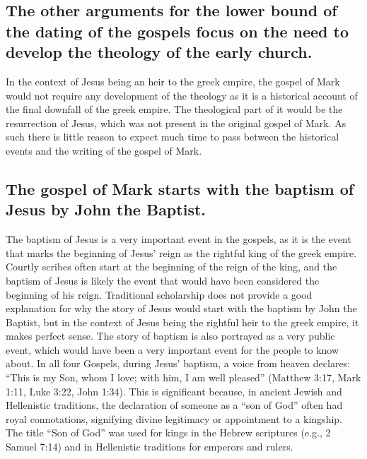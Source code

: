 \subsection{The other arguments for the lower bound of the dating of the gospels focus on the need to develop the theology of the early church.}\label{subsec:the-other-arguments-for-the-lower-bound-of-the-dating-of-the-gospels-focus-on-the-need-to-develop-the-theology-of-the-early-church.}

In the context of Jesus being an heir to the greek empire, the gospel of Mark would not require any development of the theology as it is a historical account of the final downfall of the greek empire.
The theological part of it would be the resurrection of Jesus, which was not present in the original gospel of Mark.
As such there is little reason to expect much time to pass between the historical events and the writing of the gospel of Mark.

\subsection{The gospel of Mark starts with the baptism of Jesus by John the Baptist.}\label{subsec:the-gospel-of-mark-starts-with-the-baptism-of-jesus-by-john-the-baptist.}

The baptism of Jesus is a very important event in the gospels, as it is the event that marks the beginning of Jesus' reign as the rightful king of the greek empire.
Courtly scribes often start at the beginning of the reign of the king, and the baptism of Jesus is likely the event that would have been considered the beginning of his reign.
Traditional scholarship does not provide a good explanation for why the story of Jesus would start with the baptism by John the Baptist, but in the context of Jesus being the rightful heir to the greek empire, it makes perfect sense.
The story of baptism is also portrayed as a very public event, which would have been a very important event for the people to know about.
In all four Gospels, during Jesus' baptism, a voice from heaven declares: ``This is my Son, whom I love; with him, I am well pleased'' (Matthew 3:17, Mark 1:11, Luke 3:22, John 1:34).
This is significant because, in ancient Jewish and Hellenistic traditions, the declaration of someone as a ``son of God'' often had royal connotations, signifying divine legitimacy or appointment to a kingship.
The title ``Son of God'' was used for kings in the Hebrew scriptures (e.g., 2 Samuel 7:14) and in Hellenistic traditions for emperors and rulers.

